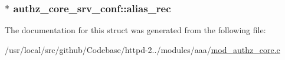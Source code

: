 \subsubsection[{\texorpdfstring{alias\+\_\+rec}{alias_rec}}]{$\ast$ authz\+\_\+core\+\_\+srv\+\_\+conf\+::alias\+\_\+rec}\hypertarget{structauthz__core__srv__conf_af97963b40a54cbbfcb038d49977b0cd2}{}\label{structauthz__core__srv__conf_af97963b40a54cbbfcb038d49977b0cd2}


The documentation for this struct was generated from the following file\+:\begin{DoxyCompactItemize}
\item 
/usr/local/src/github/\+Codebase/httpd-\/2../modules/aaa/\hyperlink{mod__authz__core_8c}{mod\+\_\+authz\+\_\+core.\+c}\end{DoxyCompactItemize}
